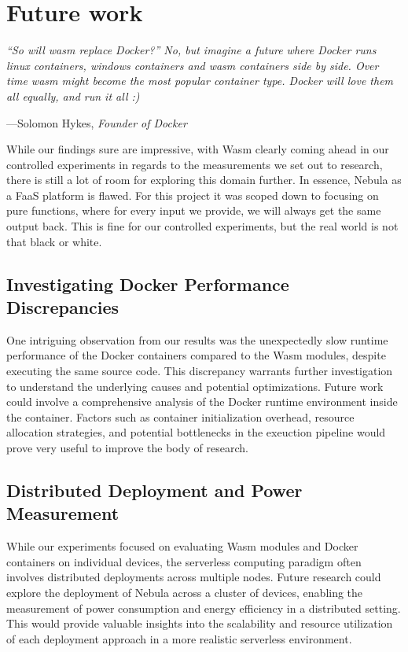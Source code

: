 \documentclass[
  table]{report}
\begin{document}
\newpage
\chapter{Future work}

\setlength{}

\epigraph{\itshape 
“So will wasm replace Docker?” No, but imagine a future where Docker runs linux
containers, windows containers and wasm containers side by side. Over time wasm
might become the most popular container type. Docker will love them all equally,
and run it all :)
}{---Solomon Hykes, \textit{Founder of Docker}}

While our findings sure are impressive, with \ac{Wasm} clearly coming
ahead in our controlled experiments in regards to the measurements we
set out to research, there is still a lot of room for exploring this
domain further. In essence, Nebula as a \ac{FaaS} platform is flawed.
For this project it was scoped down to focusing on pure functions, where
for every input we provide, we will always get the same output back.
This is fine for our controlled experiments, but the real world is not
that black or white.

\section{Investigating Docker Performance Discrepancies}

One intriguing observation from our results was the unexpectedly slow
runtime performance of the Docker containers compared to the \ac{Wasm}
modules, despite executing the same source code. This discrepancy
warrants further investigation to understand the underlying causes and
potential optimizations. Future work could involve a comprehensive
analysis of the Docker runtime environment inside the container. Factors
such as container initialization overhead, resource allocation
strategies, and potential bottlenecks in the exeuction pipeline would
prove very useful to improve the body of research.

\section{Distributed Deployment and Power Measurement}

While our experiments focused on evaluating Wasm modules and Docker
containers on individual devices, the serverless computing paradigm
often involves distributed deployments across multiple nodes. Future
research could explore the deployment of Nebula across a cluster of
devices, enabling the measurement of power consumption and energy
efficiency in a distributed setting. This would provide valuable
insights into the scalability and resource utilization of each
deployment approach in a more realistic serverless environment.
\end{document}
